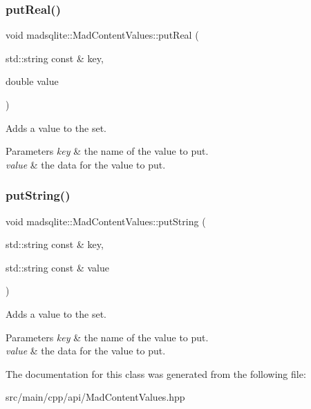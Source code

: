 \subsubsection{\texorpdfstring{put\+Real()}{putReal()}}
{\footnotesize\ttfamily void madsqlite\+::\+Mad\+Content\+Values\+::put\+Real (\begin{DoxyParamCaption}\item[{std\+::string const \&}]{key,  }\item[{double}]{value }\end{DoxyParamCaption})}

Adds a value to the set.


\begin{DoxyParams}{Parameters}
{\em key} & the name of the value to put. \\
\hline
{\em value} & the data for the value to put. \\
\hline
\end{DoxyParams}
\hypertarget{classmadsqlite_1_1_mad_content_values_ab00bdb442e3f04ff4e3dc7e04d5b68dd}{}\label{classmadsqlite_1_1_mad_content_values_ab00bdb442e3f04ff4e3dc7e04d5b68dd} 
\subsubsection{\texorpdfstring{put\+String()}{putString()}}
{\footnotesize\ttfamily void madsqlite\+::\+Mad\+Content\+Values\+::put\+String (\begin{DoxyParamCaption}\item[{std\+::string const \&}]{key,  }\item[{std\+::string const \&}]{value }\end{DoxyParamCaption})}

Adds a value to the set.


\begin{DoxyParams}{Parameters}
{\em key} & the name of the value to put. \\
\hline
{\em value} & the data for the value to put. \\
\hline
\end{DoxyParams}


The documentation for this class was generated from the following file\+:\begin{DoxyCompactItemize}
\item 
src/main/cpp/api/Mad\+Content\+Values.\+hpp\end{DoxyCompactItemize}
